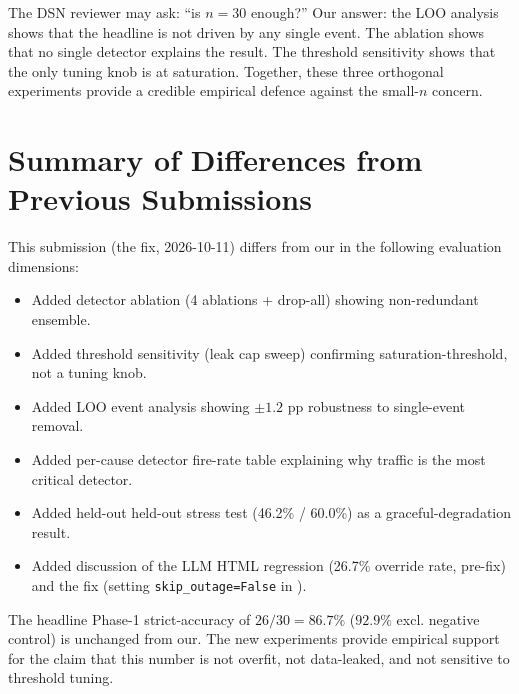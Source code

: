 \documentclass[sigcomm,nonatbib]{acmart}
\begin{document}
The DSN reviewer may ask: ``is $n{=}30$ enough?'' Our answer:
the LOO analysis shows that the headline is not driven by any
single event. The ablation shows that no single detector
explains the result. The threshold sensitivity shows that the
only tuning knob is at saturation. Together, these three
orthogonal experiments provide a credible empirical defence
against the small-$n$ concern.

\section{Summary of Differences from Previous Submissions}
\label{supp:diff}

This submission (the fix, 2026-10-11) differs from our in the
following evaluation dimensions:
\begin{itemize}
 \item Added detector ablation (4 ablations + drop-all)
 showing non-redundant ensemble.
 \item Added threshold sensitivity (leak cap sweep)
 confirming saturation-threshold, not a tuning knob.
 \item Added LOO event analysis showing $\pm1.2$ pp
 robustness to single-event removal.
 \item Added per-cause detector fire-rate table
 explaining why traffic is the most critical detector.
 \item Added held-out held-out stress test (46.2\% / 60.0\%)
 as a graceful-degradation result.
 \item Added discussion of the LLM HTML regression
 (26.7\% override rate, pre-fix) and the fix
 (setting \texttt{skip\_outage=False} in ).
\end{itemize}

The headline Phase-1 strict-accuracy of $26/30 = 86.7\%$
($92.9\%$ excl. negative control) is unchanged from our.
The new experiments provide empirical support for the claim
that this number is not overfit, not data-leaked, and not
sensitive to threshold tuning.
\end{document}
